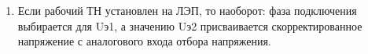 \begin{enumerate}
\item
Если рабочий ТН установлен на ЛЭП, то наоборот: фаза подключения выбирается для Uэ1, а значению
Uэ2 присваивается скорректированное напряжение с аналогового входа отбора напряжения. 

\end{enumerate}